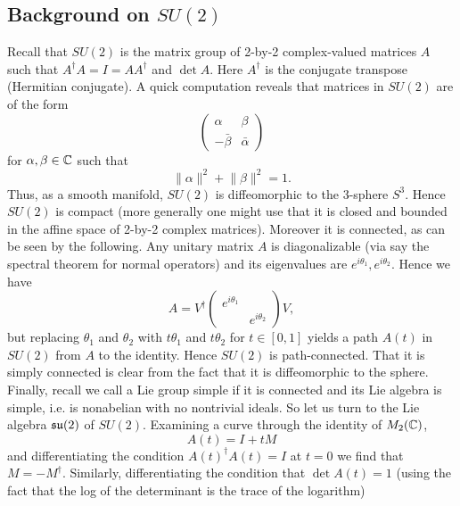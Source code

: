 \documentclass{amsart}
\begin{document}
\subsection{Background on $SU(2)$}
Recall that $SU(2)$ is the matrix group of 2-by-2 complex-valued matrices $A$ such
that $A^\dagger A = I = AA^\dagger$ and $\det A$. Here $A^\dagger$ is the conjugate
transpose (Hermitian conjugate). A quick computation reveals that matrices in $SU(2)$
are of the form
\begin{equation*}
    \begin{pmatrix}
        \alpha & \beta \\
        -\bar\beta & \bar \alpha
    \end{pmatrix}
\end{equation*}
for $\alpha,\beta\in\mathbb{C}$ such that
\begin{equation*}
    \lVert \alpha\rVert^2 + \lVert \beta\rVert^2 = 1.
\end{equation*}
Thus, as a smooth manifold, $SU(2)$ is diffeomorphic to the 3-sphere $S^3$.
Hence $SU(2)$ is compact (more generally one might use that it is closed
and bounded in the affine space of 2-by-2 complex matrices). Moreover
it is connected, as can be seen by the following. Any unitary matrix $A$ is
diagonalizable (via say the spectral theorem for normal operators) and
its eigenvalues are $e^{i\theta_1}, e^{i\theta_2}$. Hence we have
\begin{equation*}
    A = V^\dagger
    \begin{pmatrix}
        e^{i\theta_1} & \\ & e^{i\theta_2}
    \end{pmatrix}
    V,
\end{equation*}
but replacing $\theta_1$ and $\theta_2$ with $t\theta_1$ and $t\theta_2$ for
$t\in[0,1]$ yields a path $A(t)$ in $SU(2)$ from $A$ to the identity. Hence
$SU(2)$ is path-connected. That it is simply connected is clear from the fact
that it is diffeomorphic to the sphere. Finally, recall we call a Lie group
simple if it is connected and its Lie algebra is simple, i.e. is nonabelian
with no nontrivial ideals. So let us turn to the Lie algebra $\mathfrak{su}(2)$ of $SU(2)$.
Examining a curve through the identity of $M_2(\mathbb{C})$,
\begin{equation*}
    A(t) = I + tM
\end{equation*}
and differentiating the condition $A(t)^\dagger A(t) = I$ at $t=0$ we find that
$M = -M^\dagger$. Similarly, differentiating the condition that $\det A(t)=1$
(using the fact that the log of the determinant is the trace of the logarithm)
\end{document}
